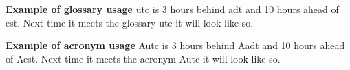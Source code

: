 % 



\pagestyle{empty} %



\cleardoublepage
{}
\pagestyle{fancy} %
\tableofcontents
\listoftodos
\printglossaries

\cleardoublepage





\textbf{Example of glossary usage}\newline
\gls{utc} is 3 hours behind \gls{adt} and 10 hours ahead of \gls{est}. Next time it meets the glossary \gls{utc} it will look like so.\newline

\textbf{Example of acronym usage}\newline
\gls{Autc} is 3 hours behind \gls{Aadt} and 10 hours ahead of \gls{Aest}. Next time it meets the acronym \gls{Autc} it will look like so.\newline

\printbibliography[heading=bibintoc]
\label{bib:mybiblio}
\appendix

